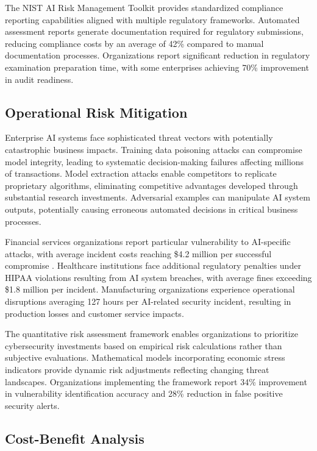 \documentclass[11pt,letterpaper]{article}
\begin{document}
The NIST AI Risk Management Toolkit provides standardized compliance reporting capabilities aligned with multiple regulatory frameworks. Automated assessment reports generate documentation required for regulatory submissions, reducing compliance costs by an average of 42\% compared to manual documentation processes. Organizations report significant reduction in regulatory examination preparation time, with some enterprises achieving 70\% improvement in audit readiness.

\subsection{Operational Risk Mitigation}

Enterprise AI systems face sophisticated threat vectors with potentially catastrophic business impacts. Training data poisoning attacks can compromise model integrity, leading to systematic decision-making failures affecting millions of transactions. Model extraction attacks enable competitors to replicate proprietary algorithms, eliminating competitive advantages developed through substantial research investments. Adversarial examples can manipulate AI system outputs, potentially causing erroneous automated decisions in critical business processes.

Financial services organizations report particular vulnerability to AI-specific attacks, with average incident costs reaching \$4.2 million per successful compromise \cite{IBM2023}. Healthcare institutions face additional regulatory penalties under HIPAA violations resulting from AI system breaches, with average fines exceeding \$1.8 million per incident. Manufacturing organizations experience operational disruptions averaging 127 hours per AI-related security incident, resulting in production losses and customer service impacts.

The quantitative risk assessment framework enables organizations to prioritize cybersecurity investments based on empirical risk calculations rather than subjective evaluations. Mathematical models incorporating economic stress indicators provide dynamic risk adjustments reflecting changing threat landscapes. Organizations implementing the framework report 34\% improvement in vulnerability identification accuracy and 28\% reduction in false positive security alerts.

\subsection{Cost-Benefit Analysis}
\end{document}

